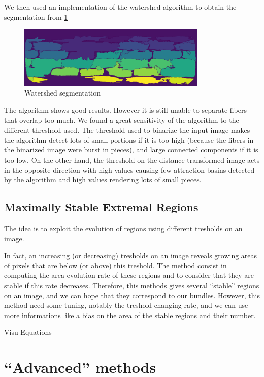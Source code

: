 \documentclass{report}
\begin{document}
We then used an implementation of the watershed algorithm to obtain the segmentation from \ref{fig:seg}

\begin{figure}[!h]
	\centering
	\includegraphics[width=9cm]{figures/Thibault/fibres_water.png}
	\caption{Watershed segmentation}
	\label{fig:seg}
\end{figure}

The algorithm shows good results. However it is still unable to separate fibers that overlap too much.\newline
We found a great sensitivity of the algorithm to the different threshold used.\newline
The threshold used to binarize the input image makes the algorithm detect lots of small portions if it is too high (because the fibers in the binarized image were burst in pieces), and large connected components if it is too low. On the other hand, the threshold on the distance transformed image acts in the opposite direction with high values causing few attraction basins detected by the algorithm and high values rendering lots of small pieces.
\section{Maximally Stable Extremal Regions}

The idea is to exploit the evolution of regions using different tresholds on an image. \newline

In fact, an increasing (or decreasing) tresholds on an image reveals growing areas of pixels that are below (or above) this treshold. The method consist in computing the area evolution rate of these regions and to consider that they are stable if this rate decreases. Therefore, this methods gives several "`stable"' regions on an image, and we can hope that they correspond to our bundles.  
However, this method need some tuning, notably the treshold changing rate, and we can use more informations like a bias on the area of the stable regions and their number.

Visu  
Equations

\chapter{"`Advanced"' methods}
\end{document}
